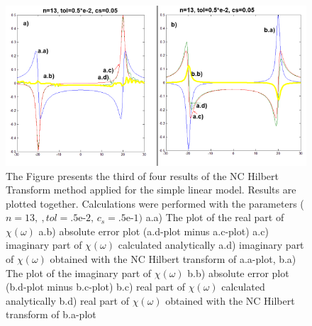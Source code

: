 \documentclass[12pt,twoside,a4paper]{article}
\numberwithin{equation}{subsection}
\numberwithin{figure}{subsection}
\begin{document}
\begin{figure}
  \includegraphics[width=150mm]{img/nc_lin3.png}
  \caption{ The Figure presents the third of four results of the NC Hilbert Transform method applied for the simple linear model. Results
   are plotted together. Calculations were performed with the parameters ($n = 13, \ , tol = \mbox{.5e-2}, \, c_s = \mbox{.5e-1})$
    a.a) The plot of the real part of $\chi (\omega )$
    a.b) absolute error plot (a.d-plot minus a.c-plot) 
    a.c) imaginary part of $\chi (\omega )$ calculated analytically 
    a.d) imaginary part of $\chi (\omega )$ obtained with the NC Hilbert transform of a.a-plot, 
    b.a) The plot of the imaginary part of $\chi (\omega )$
    b.b) absolute error plot (b.d-plot minus b.c-plot) 
    b.c) real part of $\chi (\omega )$ calculated analytically 
    b.d) real part of $\chi (\omega )$ obtained with the NC Hilbert transform of b.a-plot
    \label{fig:nc_lin3}     
  }
\end{figure}
\end{document}
